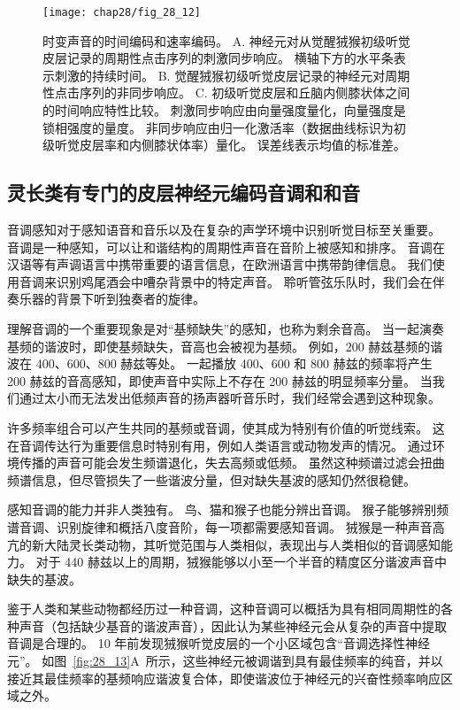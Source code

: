 \begin{figure}[htbp]
	\centering
	\texttt{[image: chap28/fig\_28\_12]}
	\caption{时变声音的时间编码和速率编码。
	A. 神经元对从觉醒狨猴初级听觉皮层记录的周期性点击序列的刺激同步响应。
	横轴下方的水平条表示刺激的持续时间\cite{lu2001temporal}。
	B. 觉醒狨猴初级听觉皮层记录的神经元对周期性点击序列的非同步响应\cite{lu2001temporal}。
	C. 初级听觉皮层和丘脑内侧膝状体之间的时间响应特性比较。
	刺激同步响应由向量强度量化，向量强度是锁相强度的量度。
	非同步响应由归一化激活率（数据曲线标识为初级听觉皮层率和内侧膝状体率）量化。
	误差线表示均值的标准差\cite{bartlett2007neural}。}
	\label{fig:28_12}
\end{figure}



\subsection{灵长类有专门的皮层神经元编码音调和和音}

音调感知对于感知语音和音乐以及在复杂的声学环境中识别听觉目标至关重要。
音调是一种感知，可以让和谐结构的周期性声音在音阶上被感知和排序。
音调在汉语等有声调语言中携带重要的语言信息，在欧洲语言中携带韵律信息。
我们使用音调来识别鸡尾酒会中嘈杂背景中的特定声音。
聆听管弦乐队时，我们会在伴奏乐器的背景下听到独奏者的旋律。


理解音调的一个重要现象是对“基频缺失”的感知，也称为剩余音高。
当一起演奏基频的谐波时，即使基频缺失，音高也会被视为基频。
例如，200 赫兹基频的谐波在 400、600、800 赫兹等处。
一起播放 400、600 和 800 赫兹的频率将产生 200 赫兹的音高感知，即使声音中实际上不存在 200 赫兹的明显频率分量。
当我们通过太小而无法发出低频声音的扬声器听音乐时，我们经常会遇到这种现象。


许多频率组合可以产生共同的基频或音调，使其成为特别有价值的听觉线索。
这在音调传达行为重要信息时特别有用，例如人类语言或动物发声的情况。
通过环境传播的声音可能会发生频谱退化，失去高频或低频。
虽然这种频谱过滤会扭曲频谱信息，但尽管损失了一些谐波分量，但对缺失基波的感知仍然很稳健。


感知音调的能力并非人类独有。
鸟、猫和猴子也能分辨出音调。
猴子能够辨别频谱音调、识别旋律和概括八度音阶，每一项都需要感知音调。
狨猴是一种声音高亢的新大陆灵长类动物，其听觉范围与人类相似，表现出与人类相似的音调感知能力。
对于 440 赫兹以上的周期，狨猴能够以小至一个半音的精度区分谐波声音中缺失的基波。


鉴于人类和某些动物都经历过一种音调，这种音调可以概括为具有相同周期性的各种声音（包括缺少基音的谐波声音），因此认为某些神经元会从复杂的声音中提取音调是合理的。
10 年前发现狨猴听觉皮层的一个小区域包含“音调选择性神经元”\cite{bendor2005neuronal}。
如图~\ref{fig:28_13}A~所示，这些神经元被调谐到具有最佳频率的纯音，并以接近其最佳频率的基频响应谐波复合体，即使谐波位于神经元的兴奋性频率响应区域之外。


